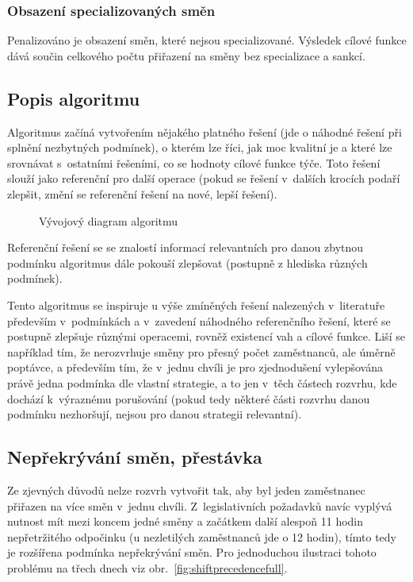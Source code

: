\documentclass[twoside]{ctuthesis}
\begin{document}
\begin{enumerate}[label=\textbf{O\arabic*.}]
\subsubsection{Obsazení specializovaných směn}
Penalizováno je obsazení směn, které nejsou specializované. Výsledek cílové funkce dává součin celkového počtu přiřazení na směny bez specializace a sankcí.

\subsection{Popis algoritmu}
Algoritmus začíná vytvořením nějakého platného řešení (jde o náhodné řešení při splnění nezbytných podmínek), o kterém lze říci, jak moc kvalitní je a které lze srovnávat s~ostatními řešeními, co se hodnoty cílové funkce týče. Toto řešení slouží jako referenční pro další operace (pokud se řešení v~dalších krocích podaří zlepšit, změní se referenční řešení na nové, lepší řešení).

\begin{figure}
	
	\caption{Vývojový diagram algoritmu}
	\label{fig:algorithmflow}
\end{figure}

Referenční řešení se se znalostí informací relevantních pro danou zbytnou podmínku algoritmus dále pokouší zlepšovat (postupně z hlediska různých podmínek).

Tento algoritmus se inspiruje u výše zmíněných řešení nalezených v~literatuře především v~podmínkách a v~zavedení náhodného referenčního řešení, které se postupně zlepšuje různými operacemi, rovněž existencí vah a cílové funkce. Liší se například tím, že nerozvrhuje směny pro přesný počet zaměstnanců, ale úměrně poptávce, a především tím, že v~jednu chvíli je pro zjednodušení vylepšována právě jedna podmínka dle vlastní strategie, a to jen v~těch částech rozvrhu, kde dochází k~výraznému porušování (pokud tedy některé části rozvrhu danou podmínku nezhoršují, nejsou pro danou strategii relevantní).

\subsection{Nepřekrývání směn, přestávka}
Ze zjevných důvodů nelze rozvrh vytvořit tak, aby byl jeden zaměstnanec přiřazen na více směn v~jednu chvíli. Z~legislativních požadavků navíc vyplývá nutnost mít mezi koncem jedné směny a začátkem další alespoň 11 hodin nepřetržitého odpočinku (u nezletilých zaměstnanců jde o 12 hodin), tímto tedy je rozšířena podmínka nepřekrývání směn. Pro jednoduchou ilustraci tohoto problému na třech dnech viz obr.~\ref{fig:shiftprecedencefull}.


\end{enumerate}
\end{document}

